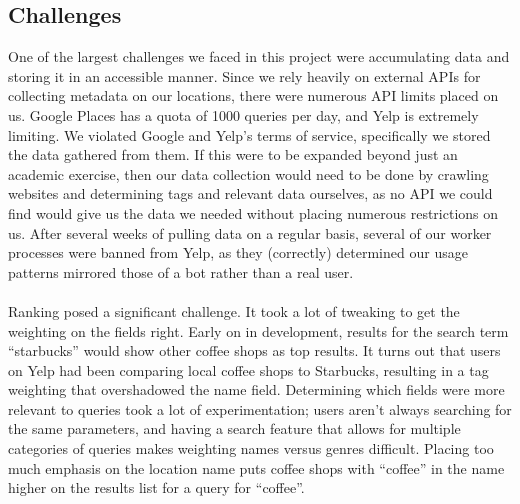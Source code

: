 \documentclass{article}
\begin{document}
\subsection{Challenges}
One of the largest challenges we faced in this project were accumulating data and storing it in an accessible manner. Since we rely heavily on external APIs for collecting metadata on our locations, there were numerous API limits placed on us. Google Places has a quota of 1000 queries per day, and Yelp is extremely limiting. We violated Google and Yelp's terms of service, specifically we stored the data gathered from them. If this were to be expanded beyond just an academic exercise, then our data collection would need to be done by crawling websites and determining tags and relevant data ourselves, as no API we could find would give us the data we needed without placing numerous restrictions on us. After several weeks of pulling data on a regular basis, several of our worker processes were banned from Yelp, as they (correctly) determined our usage patterns mirrored those of a bot rather than a real user.
\\ \\
Ranking posed a significant challenge. It took a lot of tweaking to get the weighting on the fields right. Early on in development, results for the search term ``starbucks'' would show other coffee shops as top results. It turns out that users on Yelp had been comparing local coffee shops to Starbucks, resulting in a tag weighting that overshadowed the name field. Determining which fields were more relevant to queries took a lot of experimentation; users aren't always searching for the same parameters, and having a search feature that allows for multiple categories of queries makes weighting names versus genres difficult. Placing too much emphasis on the location name puts coffee shops with ``coffee'' in the name higher on the results list for a query for ``coffee''.
\\ \\
\end{document}
